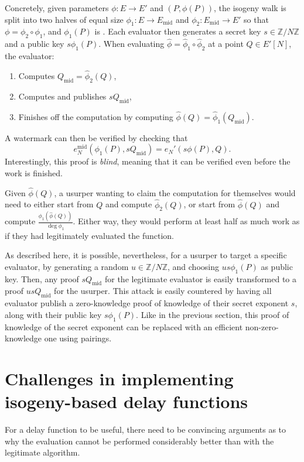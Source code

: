 \documentclass{llncs}
\newcommand{\Z}{\mathbb{Z}}
\newcommand{\Emid}{E_\mathrm{mid}}
\newcommand{\Qmid}{Q_\mathrm{mid}}
\begin{document}
Concretely, given parameters $\phi:E\to E'$ and $(P,\phi(P))$, the
isogeny walk is split into two halves of equal size
$\phi_1:E\to \Emid$ and $\phi_2:\Emid\to E'$ so that
$\phi=\phi_2\circ\phi_1$, and $\phi_1(P)$ is . %
Each evaluator then generates a secret key $s\in\Z/N\Z$ and a public
key $s\phi_1(P)$. %
When evaluating $\hat\phi=\hat\phi_1\circ\hat\phi_2$ at a point
$Q\in E'[N]$, the evaluator:
\begin{enumerate}
\item Computes $\Qmid=\hat\phi_2(Q)$,
\item Computes and publishes $s\Qmid$,
\item Finishes off the computation by computing
  $\hat\phi(Q)=\hat\phi_1(\Qmid)$.
\end{enumerate}
A watermark can then be verified by checking that
\[e_N^\mathrm{mid}(\phi_1(P),s\Qmid) = e_N'(s\phi(P),Q).\]
Interestingly, this proof is \emph{blind}, meaning that it can be
verified even before the work is finished.

Given $\hat\phi(Q)$, a usurper wanting to claim the computation for
themselves would need to either start from $Q$ and compute
$\hat\phi_2(Q)$, or start from $\hat\phi(Q)$ and compute
$\frac{\phi_1(\hat\phi(Q))}{\deg\phi_1}$. %
Either way, they would perform at least half as much work as if they
had legitimately evaluated the function.

As described here, it is possible, nevertheless, for a usurper to
target a specific evaluator, by generating a random $u\in\Z/N\Z$, and
choosing $us\phi_1(P)$ as public key. %
Then, any proof $s\Qmid$ for the legitimate evaluator is easily
transformed to a proof $us\Qmid$ for the usurper. %
This attack is easily countered by having all evaluator publish a
zero-knowledge proof of knowledge of their secret exponent $s$, along
with their public key $s\phi_1(P)$. %
Like in the previous section, this proof of knowledge of the secret
exponent can be replaced with an efficient non-zero-knowledge one
using pairings.


\section{Challenges in implementing isogeny-based delay functions}
\label{sec:secure-impl-isog}

For a delay function to be useful, there need to be convincing
arguments as to why the evaluation cannot be performed considerably
better than with the legitimate algorithm.
\end{document}
